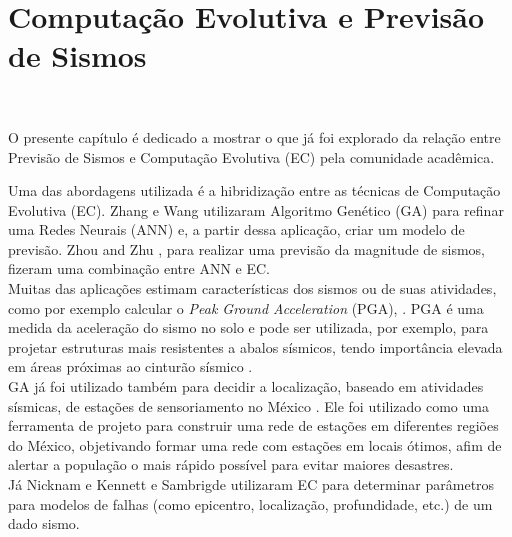 \chapter{Computação Evolutiva e Previsão de Sismos}~\label{chapter4}

O presente capítulo é dedicado a mostrar o que já foi explorado da relação entre Previsão de Sismos e Computação Evolutiva (EC) pela comunidade acadêmica.%

Uma das abordagens utilizada é a hibridização entre as técnicas de Computação Evolutiva (EC). Zhang e Wang \cite{Zhang2012} utilizaram Algoritmo Genético (GA) para refinar uma Redes Neurais (ANN) e, a partir dessa aplicação, criar um modelo de previsão. Zhou and Zhu \cite{zhou2014earthquake}, para realizar uma previsão da magnitude de sismos, fizeram uma combinação entre ANN e EC.\\

Muitas das aplicações estimam características dos sismos ou de suas atividades, como por exemplo calcular o {\it Peak Ground Acceleration} (PGA), \cite{pga_Kerh, Kermani2009, Cabalar2009}. PGA é uma medida da aceleração do sismo no solo e pode ser utilizada, por exemplo, para projetar estruturas mais resistentes a abalos sísmicos, tendo importância elevada em áreas próximas ao cinturão sísmico \cite{Cabalar2009}.\\

GA já foi utilizado também para decidir a localização, baseado em atividades sísmicas, de estações de sensoriamento no México \cite{Ramos2011}. Ele foi utilizado como uma ferramenta de projeto para construir uma rede de estações em diferentes regiões do México, objetivando formar uma rede com estações em locais ótimos, afim de alertar a população o mais rápido possível para evitar maiores desastres.\\

Já Nicknam \cite{Nicknam2010} e Kennett e Sambrigde \cite{Kennett1992} utilizaram EC para determinar parâmetros para modelos de falhas (como epicentro, localização, profundidade, etc.) de um dado sismo.\\%

